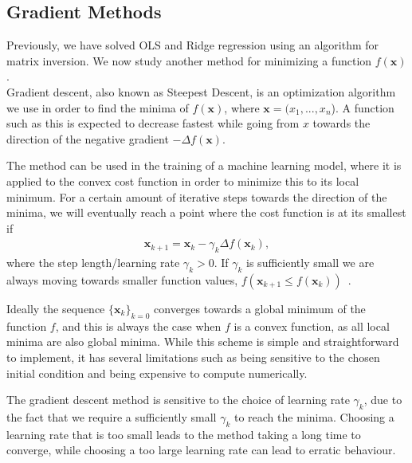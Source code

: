 \documentclass[english,notitlepage,reprint,nofootinbib]{revtex4-2}  %
\begin{document}
\subsection*{Gradient Methods}
Previously, we have solved OLS and Ridge regression using an algorithm for matrix inversion. 
We now study another method for minimizing a function $f(\boldsymbol{x})$. 
\vspace{3mm}
\\ 
Gradient descent, also known as Steepest Descent, is an optimization algorithm we use in order to find the minima of $f(\boldsymbol{x})$, where $\boldsymbol{x} = (x_1, ..., x_n$). A function such as this is expected to decrease fastest while going from $x$ towards the direction of the negative gradient $-\Delta f(\boldsymbol{x})$. 

The method can be used in the training of a machine learning model, where it is applied to the convex cost function in order to minimize this to its local minimum. 
For a certain amount of iterative steps towards the direction of the minima, we will eventually reach a point where the cost function is at its smallest if 
\begin{align}
    \boldsymbol{x}_{k+1} = \boldsymbol{x}_k - \gamma_k \Delta f(\boldsymbol{x}_k), \nonumber 
\end{align}
where the step length/learning rate $\gamma_k > 0$. If $\gamma_k$ is sufficiently small we are always moving towards smaller function values, $f(\boldsymbol{x}_{k+1} \leq f(\boldsymbol{x}_k))$~\cite{lecture_notes}. 

Ideally the sequence $\{\boldsymbol{x}_k\}_{k=0}$ converges towards a global minimum of the function $f$, and this is always the case when $f$ is a convex function, as all local minima are also global minima. While this scheme is simple and straightforward to implement, it has several limitations such as being sensitive to the chosen initial condition and being expensive to compute numerically.

The gradient descent method is sensitive to the choice of learning rate $\gamma_k$, due to the fact that we require a sufficiently small $\gamma_k$ to reach the minima. Choosing a learning rate that is too small leads to the method taking a long time to converge, while choosing a too large learning rate can lead to erratic behaviour. 
\end{document}
